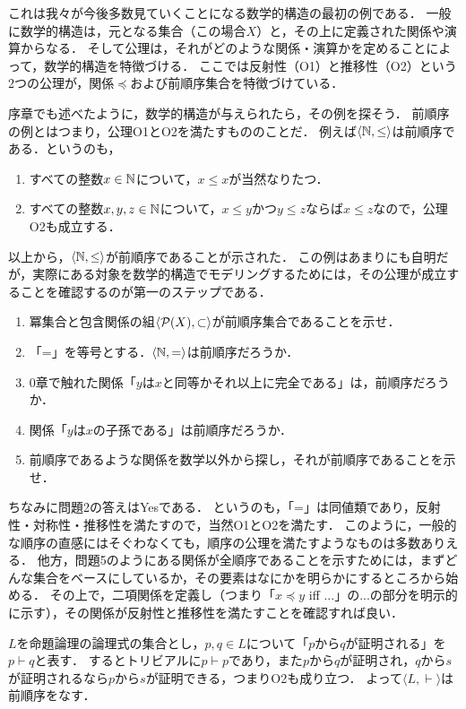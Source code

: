 \documentclass[dvipdfmx,11pt,a4paper]{jsarticle}
\begin{document}
これは我々が今後多数見ていくことになる数学的構造の最初の例である．
一般に数学的構造は，元となる集合（この場合$X$）と，その上に定義された関係や演算からなる．
そして公理は，それがどのような関係・演算かを定めることによって，数学的構造を特徴づける．
ここでは反射性（O1）と推移性（O2）という2つの公理が，関係$\preceq$および前順序集合を特徴づけている．

序章でも述べたように，数学的構造が与えられたら，その例を探そう．
前順序の例とはつまり，公理O1とO2を満たすもののことだ．
例えば$\langle \mathbb{N}, \leq \rangle$は前順序である．というのも，
\begin{enumerate}
 \item すべての整数$x \in \mathbb{N}$について，$x \leq x$が当然なりたつ．
 \item すべての整数$x, y, z \in \mathbb{N}$について，$x \leq y$かつ$y \leq z$ならば$x \leq z$なので，公理O2も成立する．
\end{enumerate}
以上から，$\langle \mathbb{N}, \leq \rangle$が前順序であることが示された．
この例はあまりにも自明だが，実際にある対象を数学的構造でモデリングするためには，その公理が成立することを確認するのが第一のステップである．

\begin{exercise}
\begin{enumerate}
 \item 冪集合と包含関係の組$\langle \mathcal{P}(X), \subset \rangle$が前順序集合であることを示せ． 
 \item 「=」を等号とする．$\langle \mathbb{N}, = \rangle$は前順序だろうか．
 \item 0章で触れた関係「$y$は$x$と同等かそれ以上に完全である」は，前順序だろうか．
 \item 関係「$y$は$x$の子孫である」は前順序だろうか．
 \item 前順序であるような関係を数学以外から探し，それが前順序であることを示せ．
\end{enumerate}
\end{exercise}

ちなみに問題2の答えはYesである．
というのも，「=」は同値類であり，反射性・対称性・推移性を満たすので，当然O1とO2を満たす．
このように，一般的な順序の直感にはそぐわなくても，順序の公理を満たすようなものは多数ありえる．
他方，問題5のようにある関係が全順序であることを示すためには，まずどんな集合をベースにしているか，その要素はなにかを明らかにするところから始める．
その上で，二項関係を定義し（つまり「$x \preceq y$ iff ...」の...の部分を明示的に示す），その関係が反射性と推移性を満たすことを確認すれば良い．

\begin{example} \label{logic}
 $L$を命題論理の論理式の集合とし，$p, q \in L$について「$p$から$q$が証明される」を$p \vdash q$と表す．
 するとトリビアルに$p \vdash p$であり，また$p$から$q$が証明され，$q$から$s$が証明されるなら$p$から$s$が証明できる，つまりO2も成り立つ．
 よって$\langle L, \vdash \rangle$は前順序をなす．
\end{example}
\end{document}

